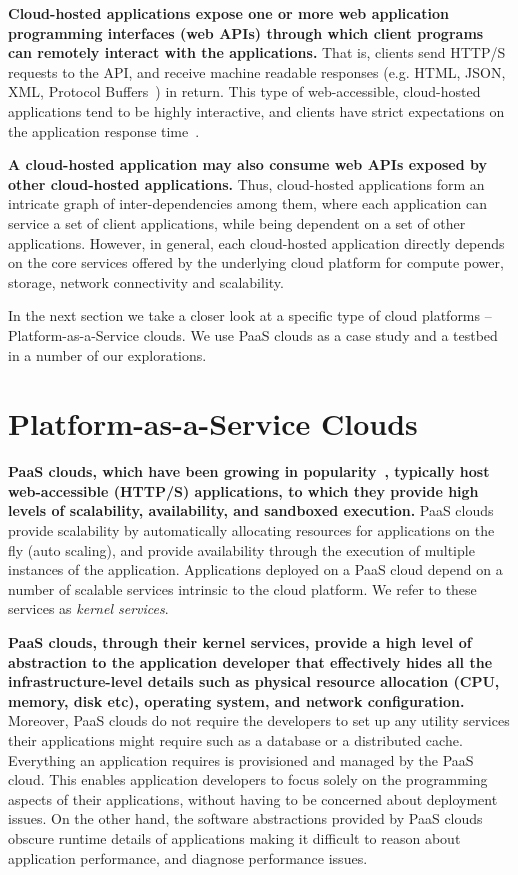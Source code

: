 \textbf{Cloud-hosted applications expose one or more web application programming 
interfaces (web APIs) through which client programs can remotely interact with the applications.} That is, clients
send HTTP/S requests to the API, and receive machine readable responses (e.g. HTML, JSON,
XML, Protocol Buffers~\cite{protobuff}) in return. This type of web-accessible, cloud-hosted applications
tend to be highly interactive, and clients have strict expectations on the application
response time~\cite{latency-matters}.

\textbf{A cloud-hosted application may
also consume web APIs exposed by other cloud-hosted applications.} Thus, cloud-hosted applications
form an intricate graph of inter-dependencies among them, where each application can service a set of client
applications, while being dependent on a set of other applications. However, in general, each cloud-hosted
application directly depends on the core services offered by the underlying cloud platform for compute power, storage,
network connectivity and scalability.

In the next section we take a closer look at a specific type of cloud platforms -- Platform-as-a-Service clouds.
We use PaaS clouds as a case study and a testbed in a number of our explorations.

\section{Platform-as-a-Service Clouds}

\textbf{PaaS clouds, which have been growing in popularity~\cite{paas-growth,paas-growth2}, 
typically host web-accessible (HTTP/S) applications, to which they provide
high levels of scalability, availability, and sandboxed execution.} PaaS clouds
provide scalability by automatically allocating resources for
applications on the fly (auto scaling), and provide availability through the
execution of multiple instances of the application. Applications deployed on
a PaaS cloud depend on a number of scalable services intrinsic to the 
cloud platform. We refer to these services as \textit{kernel services}.

\textbf{PaaS clouds, through their kernel services, provide a high level of
abstraction to the application developer that effectively hides all the
infra\-structure-level details such as physical resource allocation (CPU,
memory, disk etc), operating system, and network configuration.} 
Moreover, PaaS clouds do not require the developers
to set up any utility services their applications might require such as a 
database or a distributed cache. 
Everything an application requires is provisioned and managed by the PaaS cloud.
This enables
application developers to focus solely on the programming aspects of their
applications, without having to be concerned about deployment issues. On
the other hand, the software abstractions provided by PaaS clouds obscure
runtime details of applications making it difficult to reason about application
performance, and diagnose performance issues.

